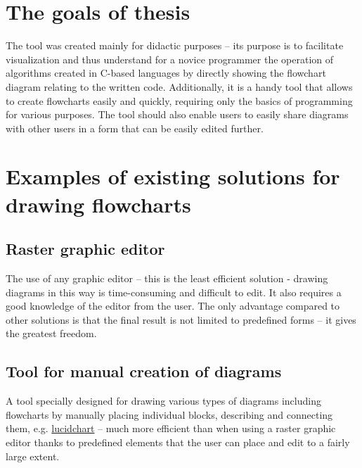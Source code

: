 \section{The goals of thesis}
The tool was created mainly for didactic purposes -- its purpose is to facilitate visualization and thus understand for a novice programmer the operation of algorithms created in C-based languages by directly showing the flowchart diagram relating to the written code. Additionally, it is a handy tool that allows to create flowcharts easily and quickly, requiring only the basics of programming for various purposes. The tool should also enable users to easily share diagrams with other users in a form that can be easily edited further.
	
\section{Examples of existing solutions for drawing flowcharts}

	\subsection{Raster graphic editor} 
	The use of any graphic editor -- this is the least efficient solution - drawing diagrams in this way is time-consuming and difficult to edit. It also requires a good knowledge of the editor from the user. The only advantage compared to other solutions is that the final result is not limited to predefined forms -- it gives the greatest freedom.
		
	\subsection{Tool for manual creation of diagrams} 			
	A tool specially designed for drawing various types of diagrams including flowcharts by manually placing individual blocks, describing and connecting them, e.g. \href{https://www.lucidchart.com/pages/examples/flowchart_software}{lucidchart} -- much more efficient than when using a raster graphic editor thanks to predefined elements that the user can place and edit to a fairly large extent.
	

